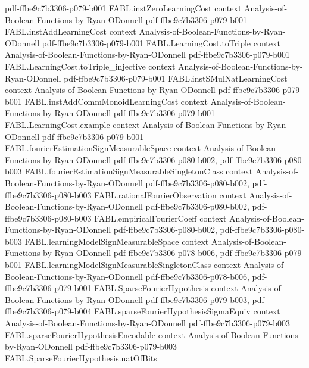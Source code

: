 \begin{theorem}
  {pdf-ffbe9c7b3306-p079-b001}
\proofstep
  {FABL.instZeroLearningCost}
  {context}
  {Analysis-of-Boolean-Functions-by-Ryan-ODonnell}
  {pdf-ffbe9c7b3306-p079-b001}
\proofstep
  {FABL.instAddLearningCost}
  {context}
  {Analysis-of-Boolean-Functions-by-Ryan-ODonnell}
  {pdf-ffbe9c7b3306-p079-b001}
\proofstep
  {FABL.LearningCost.toTriple}
  {context}
  {Analysis-of-Boolean-Functions-by-Ryan-ODonnell}
  {pdf-ffbe9c7b3306-p079-b001}
\proofstep
  {FABL.LearningCost.toTriple_injective}
  {context}
  {Analysis-of-Boolean-Functions-by-Ryan-ODonnell}
  {pdf-ffbe9c7b3306-p079-b001}
\proofstep
  {FABL.instSMulNatLearningCost}
  {context}
  {Analysis-of-Boolean-Functions-by-Ryan-ODonnell}
  {pdf-ffbe9c7b3306-p079-b001}
\proofstep
  {FABL.instAddCommMonoidLearningCost}
  {context}
  {Analysis-of-Boolean-Functions-by-Ryan-ODonnell}
  {pdf-ffbe9c7b3306-p079-b001}
\proofstep
  {FABL.LearningCost.example}
  {context}
  {Analysis-of-Boolean-Functions-by-Ryan-ODonnell}
  {pdf-ffbe9c7b3306-p079-b001}
\proofstep
  {FABL.fourierEstimationSignMeasurableSpace}
  {context}
  {Analysis-of-Boolean-Functions-by-Ryan-ODonnell}
  {pdf-ffbe9c7b3306-p080-b002,
    pdf-ffbe9c7b3306-p080-b003}
\proofstep
  {FABL.fourierEstimationSignMeasurableSingletonClass}
  {context}
  {Analysis-of-Boolean-Functions-by-Ryan-ODonnell}
  {pdf-ffbe9c7b3306-p080-b002,
    pdf-ffbe9c7b3306-p080-b003}
\proofstep
  {FABL.rationalFourierObservation}
  {context}
  {Analysis-of-Boolean-Functions-by-Ryan-ODonnell}
  {pdf-ffbe9c7b3306-p080-b002,
    pdf-ffbe9c7b3306-p080-b003}
\proofstep
  {FABL.empiricalFourierCoeff}
  {context}
  {Analysis-of-Boolean-Functions-by-Ryan-ODonnell}
  {pdf-ffbe9c7b3306-p080-b002,
    pdf-ffbe9c7b3306-p080-b003}
\proofstep
  {FABL.learningModelSignMeasurableSpace}
  {context}
  {Analysis-of-Boolean-Functions-by-Ryan-ODonnell}
  {pdf-ffbe9c7b3306-p078-b006,
    pdf-ffbe9c7b3306-p079-b001}
\proofstep
  {FABL.learningModelSignMeasurableSingletonClass}
  {context}
  {Analysis-of-Boolean-Functions-by-Ryan-ODonnell}
  {pdf-ffbe9c7b3306-p078-b006,
    pdf-ffbe9c7b3306-p079-b001}
\proofstep
  {FABL.SparseFourierHypothesis}
  {context}
  {Analysis-of-Boolean-Functions-by-Ryan-ODonnell}
  {pdf-ffbe9c7b3306-p079-b003,
    pdf-ffbe9c7b3306-p079-b004}
\proofstep
  {FABL.sparseFourierHypothesisSigmaEquiv}
  {context}
  {Analysis-of-Boolean-Functions-by-Ryan-ODonnell}
  {pdf-ffbe9c7b3306-p079-b003}
\proofstep
  {FABL.sparseFourierHypothesisEncodable}
  {context}
  {Analysis-of-Boolean-Functions-by-Ryan-ODonnell}
  {pdf-ffbe9c7b3306-p079-b003}
\proofstep
  {FABL.SparseFourierHypothesis.natOfBits}

\end{theorem}
